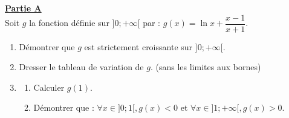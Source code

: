 \documentclass[12pt,a4paper]{article}
\begin{document}
\vspace{0.5cm}

\noindent \underline{\textbf{Partie A}} \\
Soit $g$ la fonction définie sur $]0; +\infty[$ par : $g(x) = \ln x + \dfrac{x-1}{x+1}$.
\begin{enumerate}
    \item Démontrer que $g$ est strictement croissante sur $]0; +\infty[$.
    \item Dresser le tableau de variation de $g$. (sans les limites aux bornes)
    \item \begin{enumerate}
        \item Calculer $g(1)$.
        \item Démontrer que : $\forall x \in ]0; 1[, g(x) < 0$ et $\forall x \in ]1; +\infty[, g(x) > 0$.
    \end{enumerate}
\end{enumerate}

\vspace{0.5cm}
\end{document}
